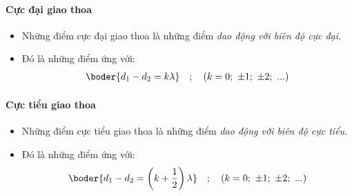 \paragraph{Cực đại giao thoa}
\begin{itemize}
\item Những điểm cực đại giao thoa là những điểm \textit{dao động với biên độ cực đại}.
\item Đó là những điểm ứng với: 
\begin{align*}
\boder{d_1-d_2=k\lambda}\quad ; \quad (k=0;\ \pm 1;\ \pm 2;\ ...)
\end{align*}
\end{itemize}
\paragraph{Cực tiểu giao thoa}
\begin{itemize}
\item Những điểm cực tiểu giao thoa là những điểm \textit{dao động với biên độ cực tiểu}.
\item Đó là những điểm ứng với: 
\begin{align*}
\boder{d_1-d_2=\left(k+\dfrac{1}{2}\right)\lambda}\quad ; \quad (k=0;\ \pm 1;\ \pm 2;\ ...)
\end{align*}
\end{itemize}
